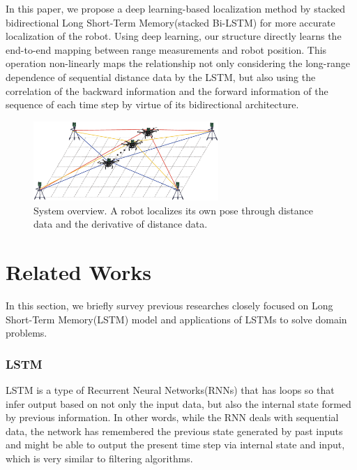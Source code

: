 \documentclass[letterpaper, 10 pt, conference]{ieeeconf}  %
\begin{document}
 In this paper, we propose a deep learning-based localization method by stacked bidirectional Long Short-Term Memory(stacked Bi-LSTM) for more accurate localization of the robot. Using deep learning, our structure directly learns the end-to-end mapping between range measurements and robot position. This operation non-linearly maps the relationship not only considering the long-range dependence of sequential distance data by the LSTM, but also using the correlation of the backward information and the forward information of the sequence of each time step by virtue of its bidirectional architecture.
 
\begin{figure}[h]
	
	\centering
	\includegraphics[height=3.0cm]{Drone_image_1}
		
	\label{fig:example}

	\caption{System overview. A robot localizes its own pose through distance data and the derivative of distance data. }
	
\end{figure}

\section{Related Works}

In this section, we briefly survey previous researches closely focused on 
Long Short-Term Memory(LSTM) model and applications of LSTMs to solve domain problems.


\subsubsection{LSTM}

LSTM is a type of Recurrent Neural Networks(RNNs) that has loops so that infer output based on not only the input data, but also the internal state formed by previous information. In other words, while the RNN deals with sequential data, the network has remembered the previous state generated by past inputs and might be able to output the present time step via internal state and input, which is very similar to filtering algorithms.
\end{document}
